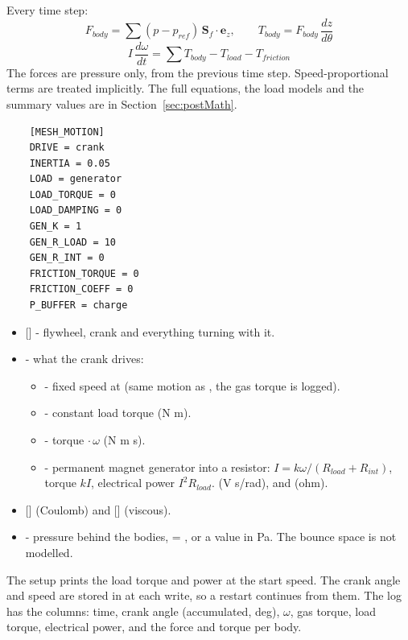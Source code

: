Every time step:
\begin{equation}
F_{body} = \sum (p - p_{ref})\, \mathbf{S}_f \cdot \mathbf{e}_z, \qquad T_{body} = F_{body}\,\frac{dz}{d\theta}
\end{equation}
\begin{equation}
I\,\frac{d\omega}{dt} = \sum T_{body} - T_{load} - T_{friction}
\end{equation}
The forces are pressure only, from the previous time step. Speed-proportional terms are treated implicitly. The full equations, the load models and the summary values are in Section~\ref{sec:postMath}.
\begin{lstlisting}
    [MESH_MOTION]
    DRIVE = crank
    INERTIA = 0.05
    LOAD = generator
    LOAD_TORQUE = 0
    LOAD_DAMPING = 0
    GEN_K = 1
    GEN_R_LOAD = 10
    GEN_R_INT = 0
    FRICTION_TORQUE = 0
    FRICTION_COEFF = 0
    P_BUFFER = charge
\end{lstlisting}
\begin{itemize}
    \item {} [] - flywheel, crank and everything turning with it.
    \item {} - what the crank drives:
    \begin{itemize}
        \item {} - fixed speed at  (same motion as , the gas torque is logged).
        \item {} - constant load torque  (N m).
        \item {} - torque  $\cdot\,\omega$ (N m s).
        \item {} - permanent magnet generator into a resistor: $I = k\omega/(R_{load} + R_{int})$, torque $kI$, electrical power $I^2 R_{load}$.  (V s/rad),  and  (ohm).
    \end{itemize}
    \item {} [] (Coulomb) and  [] (viscous).
    \item {} - pressure behind the bodies,  = , or a value in Pa. The bounce space is not modelled.
\end{itemize}
The setup prints the load torque and power at the start speed. The crank angle and speed are stored in  at each write, so a restart continues from them. The log  has the columns: time, crank angle (accumulated, deg), $\omega$, gas torque, load torque, electrical power, and the force and torque per body.

